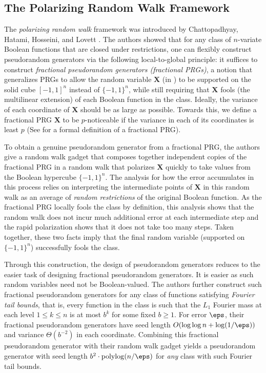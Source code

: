 \subsection{The Polarizing Random Walk Framework} \label{intro:polarize}
The \emph{polarizing random walk} framework was introduced by Chattopadhyay, Hatami, Hosseini, and Lovett \cite{CHHL}. 
The authors showed that for any class of $n$-variate Boolean functions that are closed under restrictions, one can flexibly construct pseudorandom generators via the following local-to-global principle: it suffices to construct \emph{fractional pseudorandom generators (fractional PRGs)}, a notion that generalizes PRGs to allow the random variable $\mathbf{X}$ (in ) to be supported on the solid cube $[-1,1]^n$ instead of $\{-1,1\}^n$, while still requiring that $\mathbf{X}$ fools (the multilinear extension) of each Boolean function in the class.
Ideally, the variance of each coordinate of $\mathbf{X}$ should be as large as possible.  
Towards this,  we define a fractional PRG $\mathbf{X}$ to be $p$-noticeable if the variance in each of its coordinates is least $p$ (See  for a formal definition of a fractional PRG).

To obtain a genuine pseudorandom generator from a fractional PRG,
the authors give a random walk gadget that composes together independent copies of the fractional PRG in a random walk that polarizes  $\mathbf{X}$ quickly to take values from the Boolean hypercube $\{-1,1\}^n$.
The analysis for how the error accumulates in this process relies on interpreting the intermediate points of $\mathbf{X}$ in this 
random walk as an average of \emph{random restrictions} of the original Boolean function. As the fractional PRG locally fools the class by definition, this analysis shows that the random walk does not incur much additional error at each intermediate step and the rapid polarization shows that it does not take too many steps.  Taken together, these two facts imply that the final random variable (supported on  $\{-1,1\}^n$) successfully fools the class. 

 
Through this construction, the design of pseudorandom generators reduces to the easier task of designing fractional pseudorandom generators.
It is easier as such random variables need not be Boolean-valued.
 The authors further construct such fractional pseudorandom generators for any class of functions satisfying \emph{Fourier tail bounds}, that is, every function in the class is such that the $L_1$ Fourier mass at each level $1\leq k\leq n$ is at most $b^k$ for some fixed $b\geq 1$.
 For error $\eps$, their fractional pseudorandom generators have seed length $O(\log\log n+ \log(1/\eps))$ and variance $\Theta(b^{-2})$ in each coordinate.  Combining this fractional pseudorandom generator with their random walk gadget yields a pseudorandom generator with seed length $b^2\cdot \mathrm{polylog}(n/\eps)$ for \emph{any} class with such Fourier tail bounds. 

